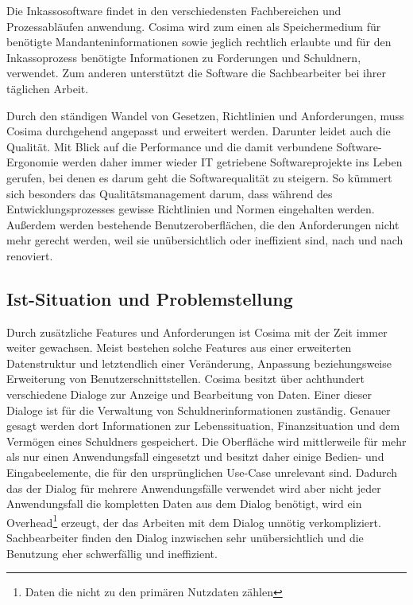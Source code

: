 Die Inkassosoftware findet in den verschiedensten Fachbereichen und Prozessabläufen anwendung. Cosima wird zum einen als Speichermedium für benötigte Mandanteninformationen sowie jeglich rechtlich erlaubte und für den Inkassoprozess benötigte Informationen zu Forderungen und Schuldnern, verwendet. Zum anderen unterstützt die Software die Sachbearbeiter bei ihrer täglichen Arbeit. 

Durch den ständigen Wandel von Gesetzen, Richtlinien und Anforderungen, muss Cosima durchgehend angepasst und erweitert werden. Darunter leidet auch die Qualität. Mit Blick auf die Performance und die damit verbundene Software-Ergonomie werden daher immer wieder IT getriebene Softwareprojekte ins Leben gerufen, bei denen es darum geht die Softwarequalität zu steigern. So kümmert sich besonders das Qualitätsmanagement darum, dass während des Entwicklungsprozesses gewisse Richtlinien und Normen eingehalten werden. Außerdem werden bestehende Benutzeroberflächen, die den Anforderungen nicht mehr gerecht werden, weil sie unübersichtlich oder ineffizient sind, nach und nach renoviert.


\subsection{Ist-Situation und Problemstellung}
Durch zusätzliche Features und Anforderungen ist Cosima mit der Zeit immer weiter gewachsen. Meist bestehen solche Features aus einer erweiterten Datenstruktur und letztendlich einer Veränderung, Anpassung beziehungsweise Erweiterung von Benutzerschnittstellen. Cosima besitzt über achthundert verschiedene Dialoge zur Anzeige und Bearbeitung von Daten. Einer dieser Dialoge ist für die Verwaltung von Schuldnerinformationen zuständig. Genauer gesagt werden dort Informationen zur Lebenssituation, Finanzsituation und dem Vermögen eines Schuldners gespeichert. Die Oberfläche wird mittlerweile für mehr als nur einen Anwendungsfall eingesetzt und besitzt daher einige Bedien- und Eingabeelemente, die für den ursprünglichen Use-Case unrelevant sind. Dadurch das der Dialog für mehrere Anwendungsfälle verwendet wird aber nicht jeder Anwendungsfall die kompletten Daten aus dem Dialog benötigt, wird ein Overhead\footnote{Daten die nicht zu den primären Nutzdaten zählen} erzeugt, der das Arbeiten mit dem Dialog unnötig verkompliziert. Sachbearbeiter finden den Dialog inzwischen sehr unübersichtlich und die Benutzung eher schwerfällig und ineffizient.

